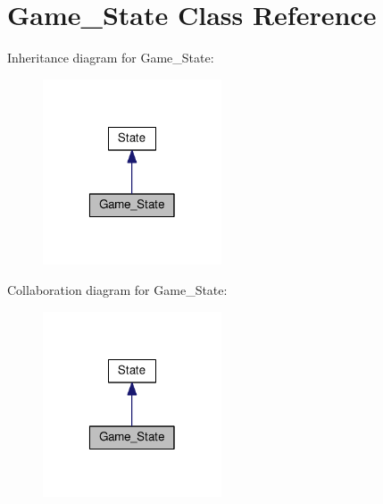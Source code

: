 \hypertarget{classGame__State}{\section{Game\+\_\+\+State Class Reference}
\label{classGame__State}
}


Inheritance diagram for Game\+\_\+\+State\+:\nopagebreak
\begin{figure}[H]
\begin{center}
\leavevmode
\includegraphics[width=150pt]{classGame__State__inherit__graph}
\end{center}
\end{figure}


Collaboration diagram for Game\+\_\+\+State\+:\nopagebreak
\begin{figure}[H]
\begin{center}
\leavevmode
\includegraphics[width=150pt]{classGame__State__coll__graph}
\end{center}
\end{figure}

